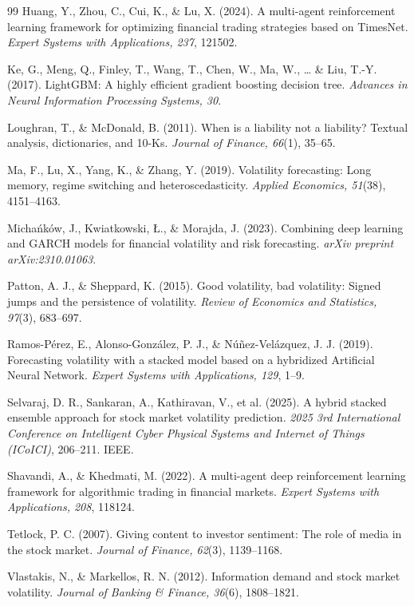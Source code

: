 \documentclass[review]{elsarticle}
\begin{document}
\begin{thebibliography}{99}
Huang, Y., Zhou, C., Cui, K., \& Lu, X. (2024). A multi-agent reinforcement learning framework for optimizing financial trading strategies based on TimesNet. \emph{Expert Systems with Applications, 237}, 121502.

Ke, G., Meng, Q., Finley, T., Wang, T., Chen, W., Ma, W., \ldots{} \& Liu, T.-Y. (2017). LightGBM: A highly efficient gradient boosting decision tree. \emph{Advances in Neural Information Processing Systems, 30}.

Loughran, T., \& McDonald, B. (2011). When is a liability not a liability? Textual analysis, dictionaries, and 10-Ks. \emph{Journal of Finance, 66}(1), 35--65.

Ma, F., Lu, X., Yang, K., \& Zhang, Y. (2019). Volatility forecasting: Long memory, regime switching and heteroscedasticity. \emph{Applied Economics, 51}(38), 4151--4163.

Micha\'{n}k\'{o}w, J., Kwiatkowski, \L., \& Morajda, J. (2023). Combining deep learning and GARCH models for financial volatility and risk forecasting. \emph{arXiv preprint arXiv:2310.01063}.

Patton, A. J., \& Sheppard, K. (2015). Good volatility, bad volatility: Signed jumps and the persistence of volatility. \emph{Review of Economics and Statistics, 97}(3), 683--697.

Ramos-P\'{e}rez, E., Alonso-Gonz\'{a}lez, P. J., \& N\'{u}\~{n}ez-Vel\'{a}zquez, J. J. (2019). Forecasting volatility with a stacked model based on a hybridized Artificial Neural Network. \emph{Expert Systems with Applications, 129}, 1--9.

Selvaraj, D. R., Sankaran, A., Kathiravan, V., et al. (2025). A hybrid stacked ensemble approach for stock market volatility prediction. \emph{2025 3rd International Conference on Intelligent Cyber Physical Systems and Internet of Things (ICoICI)}, 206--211. IEEE.

Shavandi, A., \& Khedmati, M. (2022). A multi-agent deep reinforcement learning framework for algorithmic trading in financial markets. \emph{Expert Systems with Applications, 208}, 118124.

Tetlock, P. C. (2007). Giving content to investor sentiment: The role of media in the stock market. \emph{Journal of Finance, 62}(3), 1139--1168.

Vlastakis, N., \& Markellos, R. N. (2012). Information demand and stock market volatility. \emph{Journal of Banking \& Finance, 36}(6), 1808--1821.


\end{thebibliography}
\end{document}

